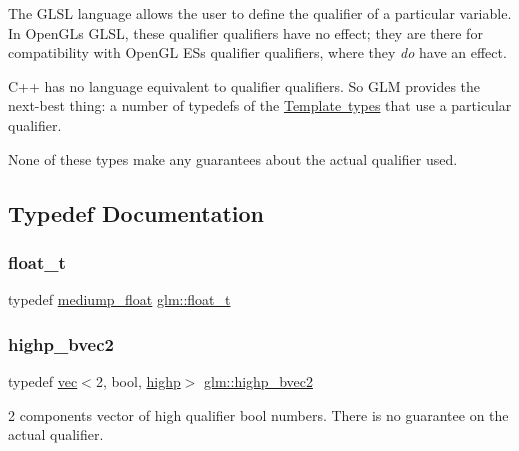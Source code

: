 The G\+L\+SL language allows the user to define the qualifier of a particular variable. In Open\+GL\textquotesingle{}s G\+L\+SL, these qualifier qualifiers have no effect; they are there for compatibility with Open\+GL ES\textquotesingle{}s qualifier qualifiers, where they {\itshape do} have an effect.

C++ has no language equivalent to qualifier qualifiers. So G\+LM provides the next-\/best thing\+: a number of typedefs of the \mbox{\hyperlink{group__core__template}{Template types}} that use a particular qualifier.

None of these types make any guarantees about the actual qualifier used. 

\subsection{Typedef Documentation}
\mbox{\label{group__core__precision_gae01b87f81bd15327230bf1b47c482b24}} 
\subsubsection{\texorpdfstring{float\+\_\+t}{float\_t}}
{\footnotesize\ttfamily typedef \mbox{\hyperlink{group__core__precision_gac785826c039fe6c97c03b37c81c1a68e}{mediump\+\_\+float}} \mbox{\hyperlink{group__core__precision_gae01b87f81bd15327230bf1b47c482b24}{glm\+::float\+\_\+t}}}

\mbox{\label{group__core__precision_gad8f63e4c7546320f6b72808fadfda3c2}} 
\subsubsection{\texorpdfstring{highp\+\_\+bvec2}{highp\_bvec2}}
{\footnotesize\ttfamily typedef \mbox{\hyperlink{structglm_1_1vec}{vec}}$<$2, bool, \mbox{\hyperlink{namespaceglm_a36ed105b07c7746804d7fdc7cc90ff25ac6f7eab42eacbb10d59a58e95e362074}{highp}}$>$ \mbox{\hyperlink{group__core__precision_gad8f63e4c7546320f6b72808fadfda3c2}{glm\+::highp\+\_\+bvec2}}}

2 components vector of high qualifier bool numbers. There is no guarantee on the actual qualifier.

